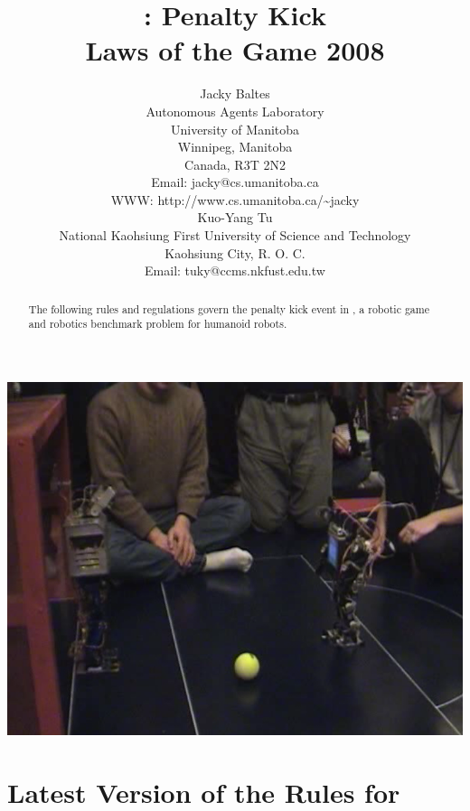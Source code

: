 \documentclass[12pt]{hurocup}
\begin{document}
\title{\HuroCup: Penalty Kick\\
  Laws of the Game 2008}


\author{Jacky Baltes\\
Autonomous Agents Laboratory\\
University of Manitoba\\
Winnipeg, Manitoba\\
Canada, R3T 2N2\\
Email: jacky@cs.umanitoba.ca\\
WWW: http://www.cs.umanitoba.ca/\~{ }jacky\\[5mm]
Kuo-Yang Tu\\
National Kaohsiung First University of Science and Technology\\
Kaohsiung City, R. O. C.\\
Email: tuky@ccms.nkfust.edu.tw\\
}

\maketitle

\begin{center}
 \includegraphics[width=0.7\linewidth]{Figures/penalty-kick-life}
\end{center}

\begin{abstract}
The following rules and regulations govern the penalty kick event in
\HuroCup, a robotic game and robotics benchmark problem for humanoid
robots.
%
\end{abstract}

\section*{Latest Version of the Rules for \HuroCup}
\label{sec:updates}
\end{document}
